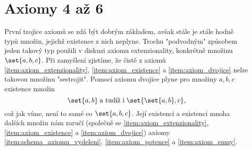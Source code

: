 \section{Axiomy 4 až 6}\label{sec:axiomy_4_az_6}
První trojice axiomů se zdá být dobrým základem, avšak stále je stále hodně typů množin, jejichž existence z nich neplyne. Trochu "podvodným" způsobem jeden takový typ použili v diskuzi axiomu extenzionality, konkrétně množinu $\set{a,b,c}$. Při zamyšlení zjistíme, že čistě z axiomů \ref{item:axiom_extenzionality}, \ref{item:axiom_existence} a \ref{item:axiom_dvojice} nelze takovou množinu "sestrojit". Pomocí axiomu dvojice plyne pro množiny $a,b,c$ existence množin
\begin{equation*}
    \set{a,b}\;\text{a tudíž i}\;\set{\set{a,b},c},
\end{equation*}
což jak víme, není to samé co $\set{a,b,c}$. Její existenci a existenci mnoha dalších množin nám zaručí (společně se \ref{item:axiom_extenzionality}, \ref{item:axiom_existence} a \ref{item:axiom_dvojice}) axiomy \ref{item:schema_axiomu_vydeleni}, \ref{item:axiom_potence} a \ref{item:axiom_sumy}.

